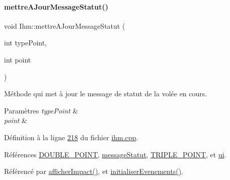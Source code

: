 \paragraph{\texorpdfstring{mettre\+A\+Jour\+Message\+Statut()}{mettreAJourMessageStatut()}\hspace{0.1cm}{\footnotesize\ttfamily [1/2]}}
{\footnotesize\ttfamily void Ihm\+::mettre\+A\+Jour\+Message\+Statut (\begin{DoxyParamCaption}\item[{int}]{type\+Point,  }\item[{int}]{point }\end{DoxyParamCaption})\hspace{0.3cm}{\ttfamily [private]}}



Méthode qui met à jour le message de statut de la volée en cours. 


\begin{DoxyParams}{Paramètres}
{\em type\+Point} & \\
\hline
{\em point} & \\
\hline
\end{DoxyParams}


Définition à la ligne \hyperlink{ihm_8cpp_source_l00218}{218} du fichier \hyperlink{ihm_8cpp_source}{ihm.\+cpp}.



Références \hyperlink{darts_8h_source_l00019}{D\+O\+U\+B\+L\+E\+\_\+\+P\+O\+I\+NT}, \hyperlink{ihm_8h_source_l00061}{message\+Statut}, \hyperlink{darts_8h_source_l00018}{T\+R\+I\+P\+L\+E\+\_\+\+P\+O\+I\+NT}, et \hyperlink{ihm_8h_source_l00052}{ui}.



Référencé par \hyperlink{ihm_8cpp_source_l00191}{afficher\+Impact()}, et \hyperlink{ihm_8cpp_source_l00075}{initialiser\+Evenements()}.


